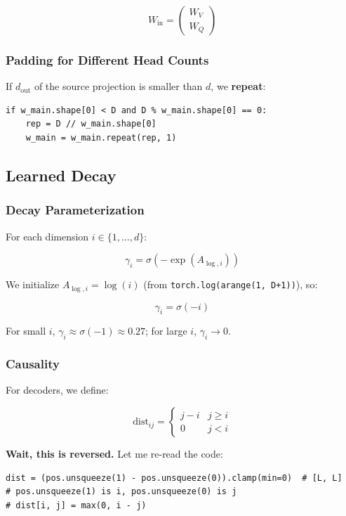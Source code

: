 \[
W_\text{in} = \begin{pmatrix} W_V \\ W_Q \end{pmatrix}
\tag{4.2}
\]

\subsubsection{Padding for Different Head Counts}

If $d_\text{out}$ of the source projection is smaller than $d$, we \textbf{repeat}:

\begin{lstlisting}
if w_main.shape[0] < D and D % w_main.shape[0] == 0:
    rep = D // w_main.shape[0]
    w_main = w_main.repeat(rep, 1)
\end{lstlisting}

\subsection{Learned Decay}

\subsubsection{Decay Parameterization}

For each dimension $i \in \{1, \dots, d\}$:

\[
\gamma_i = \sigma(-\exp(A_{\log, i}))
\tag{4.3}
\]

We initialize $A_{\log, i} = \log(i)$ (from \texttt{torch.log(arange(1, D+1))}), so:

\[
\gamma_i = \sigma(-i)
\tag{4.4}
\]

For small $i$, $\gamma_i \approx \sigma(-1) \approx 0.27$; for large $i$, 
$\gamma_i \to 0$.

\subsubsection{Causality}

For decoders, we define:

\[
\text{dist}_{ij} = \begin{cases} j - i & j \geq i \\ 0 & j < i \end{cases}
\tag{4.5}
\]

\textbf{Wait, this is reversed.} Let me re-read the code:

\begin{lstlisting}
dist = (pos.unsqueeze(1) - pos.unsqueeze(0)).clamp(min=0)  # [L, L]
# pos.unsqueeze(1) is i, pos.unsqueeze(0) is j
# dist[i, j] = max(0, i - j)
\end{lstlisting}

